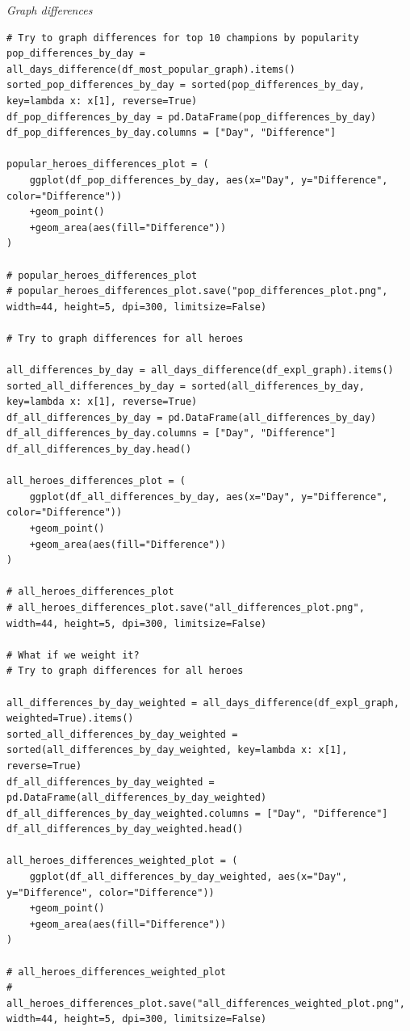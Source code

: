 \emph{Graph differences}
\begin{verbatim}
# Try to graph differences for top 10 champions by popularity
pop_differences_by_day = all_days_difference(df_most_popular_graph).items()
sorted_pop_differences_by_day = sorted(pop_differences_by_day, key=lambda x: x[1], reverse=True)
df_pop_differences_by_day = pd.DataFrame(pop_differences_by_day)
df_pop_differences_by_day.columns = ["Day", "Difference"]

popular_heroes_differences_plot = (
    ggplot(df_pop_differences_by_day, aes(x="Day", y="Difference", color="Difference"))
    +geom_point()
    +geom_area(aes(fill="Difference"))
)

# popular_heroes_differences_plot
# popular_heroes_differences_plot.save("pop_differences_plot.png", width=44, height=5, dpi=300, limitsize=False)

# Try to graph differences for all heroes

all_differences_by_day = all_days_difference(df_expl_graph).items()
sorted_all_differences_by_day = sorted(all_differences_by_day, key=lambda x: x[1], reverse=True)
df_all_differences_by_day = pd.DataFrame(all_differences_by_day)
df_all_differences_by_day.columns = ["Day", "Difference"]
df_all_differences_by_day.head()

all_heroes_differences_plot = (
    ggplot(df_all_differences_by_day, aes(x="Day", y="Difference", color="Difference"))
    +geom_point()
    +geom_area(aes(fill="Difference"))
)

# all_heroes_differences_plot
# all_heroes_differences_plot.save("all_differences_plot.png", width=44, height=5, dpi=300, limitsize=False)

# What if we weight it?
# Try to graph differences for all heroes

all_differences_by_day_weighted = all_days_difference(df_expl_graph, weighted=True).items()
sorted_all_differences_by_day_weighted = sorted(all_differences_by_day_weighted, key=lambda x: x[1], reverse=True)
df_all_differences_by_day_weighted = pd.DataFrame(all_differences_by_day_weighted)
df_all_differences_by_day_weighted.columns = ["Day", "Difference"]
df_all_differences_by_day_weighted.head()

all_heroes_differences_weighted_plot = (
    ggplot(df_all_differences_by_day_weighted, aes(x="Day", y="Difference", color="Difference"))
    +geom_point()
    +geom_area(aes(fill="Difference"))
)

# all_heroes_differences_weighted_plot
# all_heroes_differences_plot.save("all_differences_weighted_plot.png", width=44, height=5, dpi=300, limitsize=False)


\end{verbatim}
